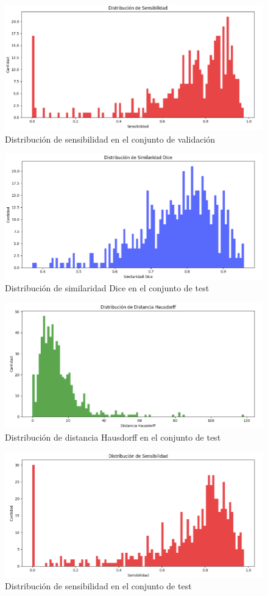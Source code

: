 \begin{figure}[H]
	\centering
	\includegraphics[width=0.7\linewidth]{imagenes/dist_sen_val.png}
	\caption{Distribución de sensibilidad en el conjunto de validación}
\end{figure}

\begin{figure}[H]
	\centering
	\includegraphics[width=0.7\linewidth]{imagenes/dist_dice_test.png}
	\caption{Distribución de similaridad Dice en el conjunto de test}
\end{figure}

\begin{figure}[H]
	\centering
	\includegraphics[width=0.7\linewidth]{imagenes/dist_haus_test.png}
	\caption{Distribución de distancia Hausdorff en el conjunto de test}
\end{figure}

\begin{figure}[H]
	\centering
	\includegraphics[width=0.7\linewidth]{imagenes/dist_sen_test.png}
	\caption{Distribución de sensibilidad en el conjunto de test}
\end{figure}

